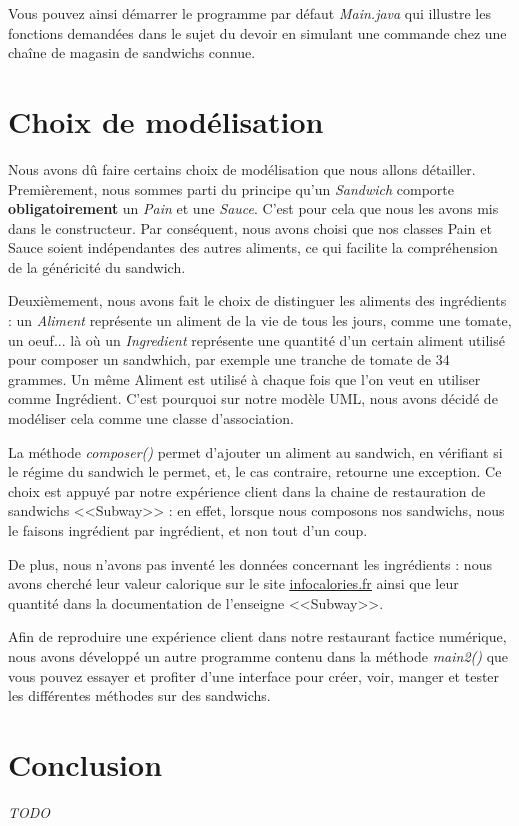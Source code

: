 \documentclass[a4paper]{article}
\begin{document}
  Vous pouvez ainsi démarrer le programme par défaut \emph{Main.java} qui illustre les fonctions demandées dans le sujet du devoir en simulant une commande chez une chaîne de magasin de sandwichs connue.


\section{Choix de modélisation}


  Nous avons dû faire certains choix de modélisation que nous allons détailler. Premièrement, nous sommes parti du principe qu'un \emph{Sandwich} comporte \textbf{obligatoirement} un \emph{Pain} et une \emph{Sauce}. C'est pour cela que nous les avons mis dans le constructeur. Par conséquent, nous avons choisi que nos classes Pain et Sauce soient indépendantes des autres aliments, ce qui facilite la compréhension de la généricité du sandwich.

  Deuxièmement, nous avons fait le choix de distinguer les aliments des ingrédients : un \emph{Aliment} représente un aliment de la vie de tous les jours, comme une tomate, un oeuf... là où un \emph{Ingredient} représente une quantité d'un certain aliment utilisé pour composer un sandwhich, par exemple une tranche de tomate de 34 grammes. Un même Aliment est utilisé à chaque fois que l'on veut en utiliser comme Ingrédient. C'est pourquoi sur notre modèle UML, nous avons décidé de modéliser cela comme une classe d'association.

  La méthode \emph{composer()} permet d'ajouter un aliment au sandwich, en vérifiant si le régime du sandwich le permet, et, le cas contraire, retourne une exception. Ce choix est appuyé par notre expérience client dans la chaine de restauration de sandwichs <<Subway>> : en effet, lorsque nous composons nos sandwichs, nous le faisons ingrédient par ingrédient, et non tout d'un coup.

  De plus, nous n'avons pas inventé les données concernant les ingrédients : nous avons cherché leur valeur calorique sur le site \href{https://www.infocalories.fr/}{\underline{infocalories.fr}} ainsi que leur quantité dans la documentation de l'enseigne <<Subway>>.

  Afin de reproduire une expérience client dans notre restaurant factice numérique, nous avons développé un autre programme contenu dans la méthode \emph{main2()} que vous pouvez essayer et profiter d'une interface pour créer, voir, manger et tester les différentes méthodes sur des sandwichs.



\section{Conclusion}

\emph{TODO}
\end{document}

